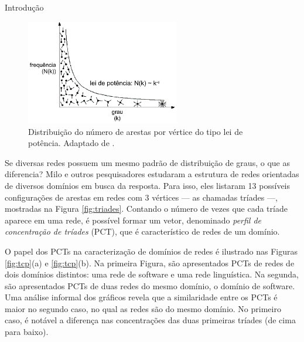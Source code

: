 \begin{section}{Introdução}

\begin{figure}[htbp]
	\centering
	\includegraphics[width=0.6\textwidth]{figuras/leidepotencia}
	\caption{Distribuição do número de arestas por vértice do tipo lei de potência. Adaptado de \cite{Barabasi2007}.}
	\label{fig:leidepotencia}
\end{figure}



Se diversas redes possuem um mesmo padrão de distribuição de graus, o que as diferencia? Milo e outros pesquisadores \cite{Milo2002} estudaram a estrutura de redes orientadas de diversos domínios em busca da resposta. Para isso, eles listaram 13 possíveis configurações de arestas em redes com 3 vértices --- as chamadas tríades ---, mostradas na Figura \ref{fig:triades}. Contando o número de vezes que cada tríade aparece em uma rede, é possível formar um vetor, denominado \emph{perfil de concentração de tríades} (PCT), que é característico de redes de um domínio. 

O papel dos PCTs na caracterização de domínios de redes é ilustrado nas Figuras \ref{fig:tcp}(a) e \ref{fig:tcp}(b). Na primeira Figura, são apresentados PCTs de redes de dois domínios distintos: uma rede de software e uma rede linguística. Na segunda, são apresentados PCTs de duas redes do mesmo domínio, o domínio de software. Uma análise informal dos gráficos revela que a similaridade entre os PCTs é maior no segundo caso, no qual as redes são do mesmo domínio. No primeiro caso, é notável a diferença nas concentrações das duas primeiras tríades (de cima para baixo). 
% 


\end{section}
